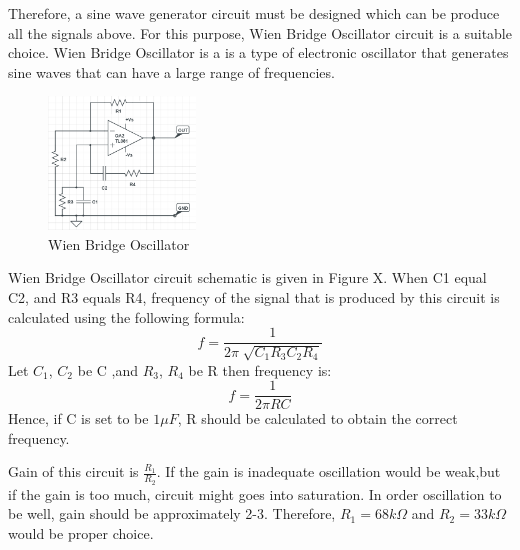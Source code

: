 \documentclass[letterpaper,12pt]{article}
\begin{document}
Therefore, a sine wave generator circuit must be designed which can be produce all the signals above. For this purpose, Wien Bridge Oscillator circuit is a suitable choice. Wien Bridge Oscillator is a is a type of electronic oscillator that generates sine waves that can have a large range of frequencies.
\begin{figure}[h]
    \centering
    \includegraphics[width = 0.35\textwidth]{WIENBRDGE.png}
    \caption{Wien Bridge Oscillator}
\end{figure} 
Wien Bridge Oscillator circuit schematic is given in Figure X. When C1 equal C2, and R3 equals R4, frequency of the signal that is produced by this circuit is calculated using the following formula:
\[f = \frac{1}{2\pi \sqrt[]{C_1R_3C_2R_4}}\]
Let \(C_1\), \(C_2\) be C ,and \(R_3\), \(R_4\) be R then frequency is:
\[f = \frac{1}{2\pi RC}\]
Hence, if C is set to be \(1\mu F\), R should be calculated to obtain the correct frequency. 

Gain of this circuit is \(\frac{R_1}{R_2}\). If the gain is inadequate oscillation would be weak,but if the gain is too much, circuit might goes into saturation. In order oscillation to be well, gain should be approximately 2-3. Therefore, \(R_1 = 68k\Omega\) and \(R_2 = 33k\Omega\) would be proper choice.
\end{document}
